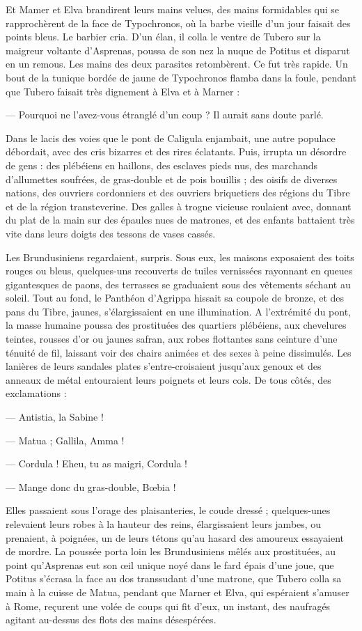 \documentclass[a4paper, 11pt, oneside, polutonikogreek, french]{article}
\begin{document}
Et Mamer et Elva brandirent leurs mains velues, des mains formidables qui se rapprochèrent de la face de Typochronos, où la barbe vieille d'un jour faisait des points bleus. Le barbier cria. D'un élan, il colla le ventre de Tubero sur la maigreur voltante d'Asprenas, poussa de son nez la nuque de Potitus et disparut en un remous. Les mains des deux parasites retombèrent. Ce fut très rapide. Un bout de la tunique bordée de jaune de Typochronos flamba dans la foule, pendant que Tubero faisait très dignement à Elva et à Marner :

--- Pourquoi ne l'avez-vous étranglé d'un coup ? Il aurait sans doute parlé.

Dans le lacis des voies que le pont de Caligula enjambait, une autre populace débordait, avec des cris bizarres et des rires éclatants. Puis, irrupta un désordre de gens : des plébéiens en haillons, des esclaves pieds nus, des marchands d'allumettes soufrées, de gras-double et de pois bouillis ; des oisifs de diverses nations, des ouvriers cordonniers et des ouvriers briquetiers des régions du Tibre et de la région transteverine. Des galles à trogne vicieuse roulaient avec, donnant du plat de la main sur des épaules nues de matrones, et des enfants battaient très vite dans leurs doigts des tessons de vases cassés.

Les Brundusiniens regardaient, surpris. Sous eux, les maisons exposaient des toits rouges ou bleus, quelques-uns recouverts de tuiles vernissées rayonnant en queues gigantesques de paons, des terrasses se graduaient sous des vêtements séchant au soleil. Tout au fond, le Panthéon d’Agrippa hissait sa coupole de bronze, et des pans du Tibre, jaunes, s'élargissaient en une illumination. A l'extrémité du pont, la masse humaine poussa des prostituées des quartiers plébéiens, aux chevelures teintes, rousses d'or ou jaunes safran, aux robes flottantes sans ceinture d'une ténuité de fil, laissant voir des chairs animées et des sexes à peine dissimulés. Les lanières de leurs sandales plates s'entre-croisaient jusqu'aux genoux et des anneaux de métal entouraient leurs poignets et leurs cols. De tous côtés, des exclamations :

--- Antistia, la Sabine !

--- Matua ; Gallila, Amma !

--- Cordula ! Eheu, tu as maigri, Cordula !

--- Mange donc du gras-double, Bœbia !

Elles passaient sous l'orage des plaisanteries, le coude dressé ; quelques-unes relevaient leurs robes à la hauteur des reins, élargissaient leurs jambes, ou prenaient, à poignées, un de leurs tétons qu'au hasard des amoureux essayaient de mordre. La poussée porta loin les Brundusiniens mêlés aux prostituées, au point qu'Asprenas eut son œil unique noyé dans le fard épais d'une joue, que Potitus s'écrasa la face au dos transsudant d'une matrone, que Tubero colla sa main à la cuisse de Matua, pendant que Marner et Elva, qui espéraient s'amuser à Rome, reçurent une volée de coups qui fit d'eux, un instant, des naufragés agitant au-dessus des flots des mains désespérées.
\end{document}
